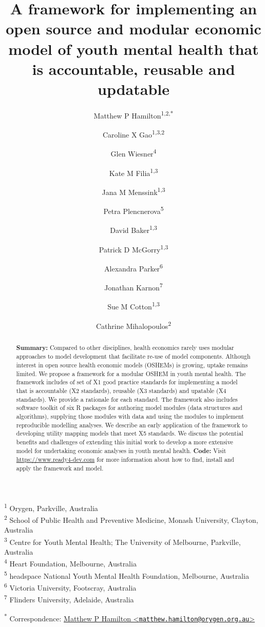 \documentclass[
]{article}
\title{A framework for implementing an open source and modular economic model of youth mental health that is accountable, reusable and updatable}
\author{Matthew P Hamilton\textsuperscript{1,2,*} \and Caroline X Gao\textsuperscript{1,3,2} \and Glen Wiesner\textsuperscript{4} \and Kate M Filia\textsuperscript{1,3} \and Jana M Menssink\textsuperscript{1,3} \and Petra Plencnerova\textsuperscript{5} \and David Baker\textsuperscript{1,3} \and Patrick D McGorry\textsuperscript{1,3} \and Alexandra Parker\textsuperscript{6} \and Jonathan Karnon\textsuperscript{7} \and Sue M Cotton\textsuperscript{1,3} \and Cathrine Mihalopoulos\textsuperscript{2}}
\date{}
\begin{document}
\maketitle
\begin{abstract}
\textbf{Summary: } Compared to other disciplines, health economics rarely uses modular approaches to model development that facilitate re-use of model components. Although interest in open source health economic models (OSHEMs) is growing, uptake remains limited. We propose a framework for a modular OSHEM in youth mental health. The framework includes of set of X1 good practice standards for implementing a model that is accountable (X2 standards), reusable (X3 standards) and upatable (X4 standards). We provide a rationale for each standard. The framework also includes software toolkit of six R packages for authoring model modules (data structures and algorithms), supplying those modules with data and using the modules to implement reproducible modelling analyses. We describe an early application of the framework to developing utility mapping models that meet X5 standards. We discuss the potential benefits and challenges of extending this initial work to develop a more extensive model for undertaking economic analyses in youth mental health. \newline \newline \textbf{Code: } Visit \url{https://www.ready4-dev.com} for more information about how to find, install and apply the framework and model. \newline \newline
\end{abstract}

\textsuperscript{1} Orygen, Parkville, Australia\\
\textsuperscript{2} School of Public Health and Preventive Medicine, Monash University, Clayton, Australia\\
\textsuperscript{3} Centre for Youth Mental Health; The University of Melbourne, Parkville, Australia\\
\textsuperscript{4} Heart Foundation, Melbourne, Australia\\
\textsuperscript{5} headspace National Youth Mental Health Foundation, Melbourne, Australia\\
\textsuperscript{6} Victoria University, Footscray, Australia\\
\textsuperscript{7} Flinders University, Adelaide, Australia

\textsuperscript{*} Correspondence: \href{mailto:matthew.hamilton@orygen.org.au}{Matthew P Hamilton \textless{}\href{mailto:matthew.hamilton@orygen.org.au}{\nolinkurl{matthew.hamilton@orygen.org.au}}\textgreater{}}
\end{document}
